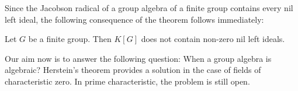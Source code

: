 Since the Jacobson radical of a group algebra of a finite group contains 
every nil left ideal, the following consequence of the theorem follows immediately:

\begin{corollary}
	\label{cor:GfinitoNOnil}
	Let $G$ be a finite group. Then $K[G]$ does not contain non-zero nil left ideals. 
\end{corollary}



%
%
%



Our aim now is to answer the following question: When
a group algebra is algebraic? Herstein's theorem provides
a solution in the case of fields of characteristic zero. In prime characteristic,
the problem is still open. 


